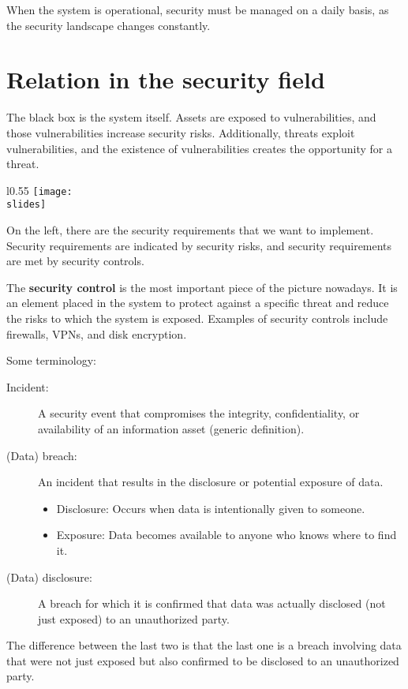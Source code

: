 When the system is operational, security must be managed on a daily basis, as the security landscape changes constantly.


\section{Relation in the security field}

The black box is the system itself.
Assets are exposed to vulnerabilities, and those vulnerabilities increase security risks.
Additionally, threats exploit vulnerabilities, and the existence of vulnerabilities creates the opportunity for a threat.
\begin{wrapfigure}{l}{0.55\textwidth}
  \centering
  \texttt{[image: \\slides]}
\end{wrapfigure}
On the left, there are the security requirements that we want to implement. Security requirements are indicated by security risks, and security requirements are met by security controls.

The \textbf{security control} is the most important piece of the picture nowadays. It is an element placed in the system to protect against a specific threat and reduce the risks to which the system is exposed. Examples of security controls include firewalls, VPNs, and disk encryption.

\bigskip
Some terminology:
\begin{description}
  \item[Incident:] A security event that compromises the integrity, confidentiality, or availability of an information asset (generic definition).
  \item[(Data) breach:] An incident that results in the disclosure or potential exposure of data.
    \begin{itemize}
      \item Disclosure: Occurs when data is intentionally given to someone.
      \item Exposure: Data becomes available to anyone who knows where to find it.
    \end{itemize}
  \item[(Data) disclosure:] A breach for which it is confirmed that data was actually disclosed (not just exposed) to an unauthorized party.
\end{description}
The difference between the last two is that the last one is a breach involving data that were not just exposed but also confirmed to be disclosed to an unauthorized party.


